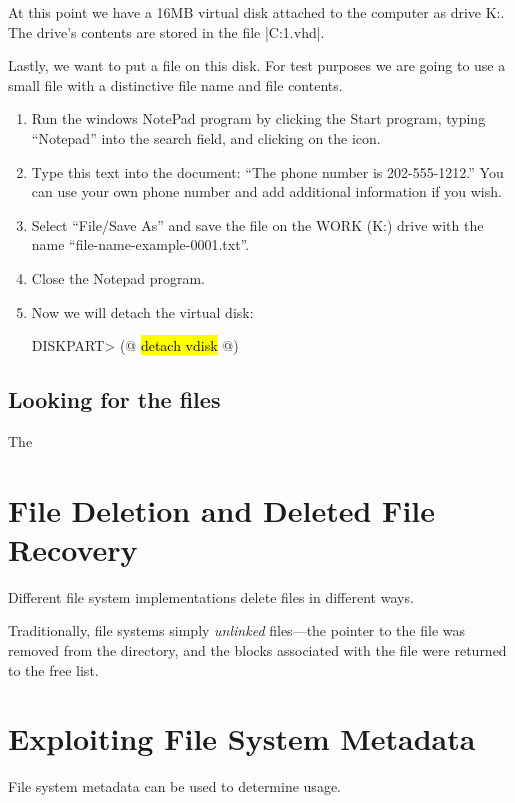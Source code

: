 At this point we have a 16MB virtual disk attached to the computer as
drive K:. The drive's contents are stored in the file |C:\disk1.vhd|.

Lastly, we want to put a file on this disk. For test purposes we are
going to use a small file with a distinctive file name and file
contents.

\begin{enumerate}[resume]
\item Run the windows NotePad program by clicking the Start program,
typing ``Notepad'' into the search field, and clicking on the icon.

\item Type this text into the document:  ``The phone number is
202-555-1212.'' You can use your own phone number and add additional
information if you wish.

\item Select ``File/Save As'' and save the file on the WORK (K:) drive
with the name ``file-name-example-0001.txt''. 

\item Close the Notepad program.

\item Now we will detach the virtual disk:

\begin{code}
DISKPART> (@ \hl{detach vdisk} @)
\end{code}

\end{enumerate}

\subsection{Looking for the files}
The 

\section{File Deletion and Deleted File Recovery}\label{deleted_file_recovery}
Different file system implementations delete files in different ways.

Traditionally, file systems simply \emph{unlinked} files---the pointer
to the file was removed from the directory, and the blocks associated
with the file were returned to the free list.


\section{Exploiting File System Metadata}
File system metadata can be used to determine usage. 
\cite{dfrws2011:JonathanGrier}

